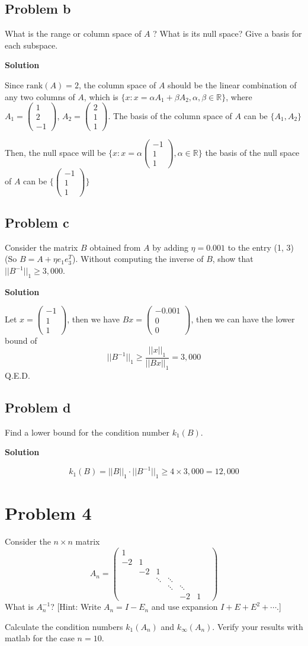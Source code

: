 \documentclass[12pt,oneside,a4paper]{article}
\newcommand{\problem}[1]
{
    \clearpage
    \section*{Problem {#1}}
}
\newcommand{\subproblem}[1]
{
    \subsection*{Problem {#1}}
}
\newcommand{\solution}
{
    \vspace{15pt}
    \noindent\ignorespaces\textbf{\large Solution}\par
}
\begin{document}
\subproblem{b}
What is the range or column space of $A$ ? What is its null space? Give a basis for each subspace.

\solution
Since $\mathrm{rank}(A) = 2$, the column space of $A$ should be the linear combination of any two columns of $A$, which is $\{x: x = \alpha A_{1} + \beta A_{2}, \alpha,\beta \in \mathbb{R} \}$, where $A_{1} = \begin{pmatrix}
1\\
2\\
-1
\end{pmatrix}$, $A_{2} = \begin{pmatrix}
2\\
1\\
1
\end{pmatrix}$.
The basis of the column space of $A$ can be $\{A_{1}, A_{2}\}$

Then, the null space will be $\{x: x = \alpha\begin{pmatrix}
-1\\
1\\
1
\end{pmatrix}, \alpha \in \mathbb{R}\}$
the basis of the null space of $A$ can be $\{\begin{pmatrix}
-1\\
1\\
1
\end{pmatrix}\}$

\subproblem{c}
Consider the matrix $B$ obtained from $A$ by adding $\eta = 0.001$ to the entry (1, 3) (So $B = A + \eta e_{1} e^{T}_{3}$). Without computing the inverse of $B$, show that $||B^{-1}||_{1} \geq 3,000$.

\solution
Let $x = \begin{pmatrix}
-1\\
1\\
1
\end{pmatrix}$, then we have $Bx = \begin{pmatrix}
  -0.001\\
   0\\
   0
\end{pmatrix}$, then we can have the lower bound of 
$$||B^{-1}||_{1} \geq \frac{||x||_{1}}{||Bx||_{1}} = 3,000$$
Q.E.D.

\subproblem{d}
Find a lower bound for the condition number $k_{1}(B)$.

\solution
$$k_{1}(B) = ||B||_{1} \cdot ||B^{-1}||_{1} \geq 4 \times 3,000 = 12,000$$

\problem{4}
Consider the $n\times n$ matrix
$$A_{n} = \begin{pmatrix}
1 &  & & & & &\\
-2& 1& & & & &\\
  &  -2& 1&  & & &\\
  & &\ddots&\ddots& & &\\
  &  & & \ddots & \ddots & &\\
    & &  & & -2 & 1
\end{pmatrix}$$
What is $A_{n}^{-1}$? [Hint: Write $A_{n} = I - E_{n}$ and use expansion $I + E + E^{2} + \cdots$.]\par
Calculate the condition numbers $k_{1}(A_{n})$ and $k_{\infty}(A_{n})$. Verify your results with matlab for the case $n = 10$.
\end{document}
